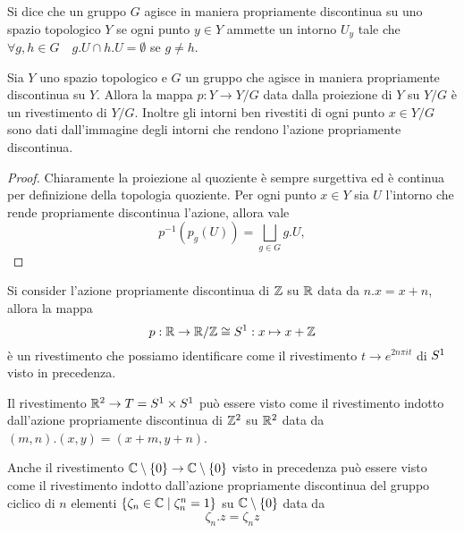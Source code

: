 \documentclass[]{article}
\begin{document}
\begin{definition}  \nl
    Si dice che un gruppo $G$ agisce in maniera propriamente discontinua su uno spazio topologico $Y$ se
    ogni punto $y \in Y$ ammette un intorno $U_y$ tale che $\forall g,h \in G \quad g.U \cap h.U = \emptyset$ se $g \neq h$.
\end{definition}

\begin{proposition}  \nl
    Sia $Y$ uno spazio topologico e $G$ un gruppo che agisce in maniera propriamente discontinua su $Y$.
    Allora la mappa $p: Y \to Y/G$ data dalla proiezione di $Y$ su $Y/G$ \`e un rivestimento di $Y/G$.
    Inoltre gli intorni ben rivestiti di ogni punto $x \in Y/G$ sono dati dall'immagine degli intorni che rendono l'azione propriamente discontinua.
\end{proposition}

\begin{proof} \nl
    Chiaramente la proiezione al quoziente \`e sempre surgettiva ed \`e continua per definizione della topologia quoziente. \nl
    Per ogni punto $x \in Y$ sia $U$ l'intorno che rende propriamente discontinua l'azione, allora vale
    \[
        p^{-1}(p_g(U)) = \bigsqcup_{g \in G} g.U,
    \]
\end{proof}

\begin{example} \nl
    Si consider l'azione propriamente discontinua di $\mathbb{Z}$ su $\mathbb{R}$ data da $n . x = x + n$, allora la mappa
    \[
        p: \mathbb{R} \to \mathbb{R} / \mathbb{Z} \cong S^{1}: x \mapsto x + \mathbb{Z}
    \]
    \`e un rivestimento che possiamo identificare come il rivestimento $t \to e^{2 n \pi i t}$ di $S^{1}$ visto in precedenza.
\end{example}

\begin{example} \nl
    Il rivestimento $\mathbb{R}^2 \to T = S^{1} \times S^{1}$ pu\`o essere visto come il rivestimento indotto
    dall'azione propriamente discontinua di $\mathbb{Z}^2$ su $\mathbb{R}^2$ data da $(m, n) . (x, y) = (x + m, y + n)$.
\end{example}

\begin{example} \nl
    Anche il rivestimento $\mathbb{C} \setminus \left\{ 0 \right\} \to \mathbb{C} \setminus \left\{ 0 \right\}$ visto in precedenza pu\`o essere visto come il rivestimento indotto dall'azione propriamente discontinua
     del gruppo ciclico di $n$ elementi $\left\{ \zeta_n \in \mathbb{C} \mid \zeta_n^n =1 \right\}$ su $\mathbb{C} \setminus \left\{ 0 \right\}$ data da
     \[
        \zeta_n. z = \zeta_n z
     \]
\end{example}
\end{document}
